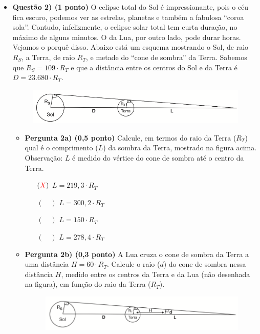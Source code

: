 \documentclass[a4paper, 12pt]{article}
\newcommand{\red}[1]{\textcolor{red}{#1}}
\begin{document}
\begin{flushleft}
\begin{itemize}
        \item \textbf{Questão 2) (1 ponto)} O eclipse total do Sol é impressionante, pois o céu fica escuro, podemos ver as estrelas, planetas e também a fabulosa ``coroa sola''. Contudo, infelizmente, o eclipse solar total tem curta duração, no máximo de alguns minutos. O da Lua, por outro lado, pode durar horas. Vejamos o porquê disso. \linebreak \linebreak Abaixo está um esquema mostrando o Sol, de raio $R_S$, a Terra, de raio $R_T$, e metade do ``cone de sombra'' da Terra. Sabemos que $R_S = 109 \cdot R_T$ e que a distância entre os centros do Sol e da Terra é $D = 23.680 \cdot R_T$.
            \begin{figure}[H]
                \centering
                \includegraphics[scale=0.5]{img/2a.png}
            \end{figure}
            \begin{itemize}
                \item \textbf{Pergunta 2a) (0,5 ponto)} Calcule, em termos do raio da Terra ($R_T$) qual é o comprimento ($L$) da sombra  da  Terra,  mostrado  na  figura acima. Observação: $L$  é  medido  do  vértice  do  cone  de sombra até o centro da Terra.
                    \begin{itemize}
                        \item[$(\red{X})$] $L = 219,3 \cdot R_T$
                        \item[$(\quad)$] $L = 300,2 \cdot R_T$
                        \item[$(\quad)$] $L = 150 \cdot R_T$
                        \item[$(\quad)$] $L = 278,4 \cdot R_T$
                    \end{itemize}
                \item \textbf{Pergunta 2b) (0,3 ponto)} A  Lua cruza  o  cone  de  sombra  da  Terra  a uma distância $H = 60 \cdot R_T$. Calcule o raio ($d$) do cone de sombra nessa distância $H$, medido entre os centros da Terra e da Lua (não desenhada na figura), em função do raio da Terra ($R_T$).
                    \begin{figure}[H]
                        \centering
                        \includegraphics[scale=0.5]{img/2b.png}

\end{figure}
\end{itemize}
\end{itemize}
\end{flushleft}
\end{document}
